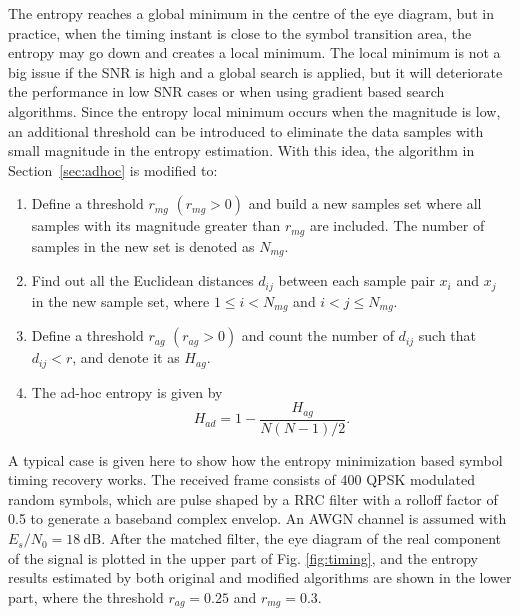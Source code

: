 \documentclass[journal,comsoc]{IEEEtran}
\begin{document}
The entropy reaches a global minimum in the centre of the eye diagram, but in practice, when the timing instant is close to the symbol transition area, the entropy may go down and creates a local minimum. 
The local minimum is not a big issue if the SNR is high and a global search is applied, but it will deteriorate the performance in low SNR cases or when using gradient based search algorithms.
Since the entropy local minimum occurs when the magnitude is low,  an additional threshold can be introduced to eliminate the data samples with small magnitude in the entropy estimation.
With this idea, the algorithm in Section~\ref{sec:adhoc} is modified to:
\begin{enumerate}

\item Define a threshold \(r_{mg}\) \((r_{mg}>0)\) and build a new samples set where all samples with its magnitude greater than \(r_{mg}\) are included.
The number of samples in the new set is denoted as \(N_{mg}\).
\item Find out all the Euclidean distances \(d_{ij}\) between each sample pair \(x_i\) and \(x_j\) in the new sample set, where \(1\le i<N_{mg}\) and \( i<j \le N_{mg}\). 
\item Define a threshold \(r_{ag}\) \((r_{ag}>0)\) and count the number of \(d_{ij}\) such that $d_{ij}<r$, and denote it as $H_{ag}$.
\item The ad-hoc entropy is given by
\begin{equation}
H_{ad}= 1- \frac{ H_{ag}}{ N(N-1)/2}.
\label{eq:entorpy_ad2}
\end{equation}
\end{enumerate}



A typical case is given here to show how the entropy minimization based symbol timing recovery works.
The received frame consists of 400 QPSK modulated random symbols, 
which are pulse shaped by a RRC filter with a rolloff factor of 0.5 to generate a baseband complex envelop.
An AWGN channel is assumed with $E_s/N_0 = 18~\text{dB}$. 
After the matched filter, the eye diagram of the real component of the signal is plotted in the upper part of Fig. \ref{fig:timing}, and the entropy results estimated by both original and modified algorithms are shown in the lower part,
where the threshold $r_{ag}=0.25$ and \(r_{mg}=0.3\).
\end{document}
